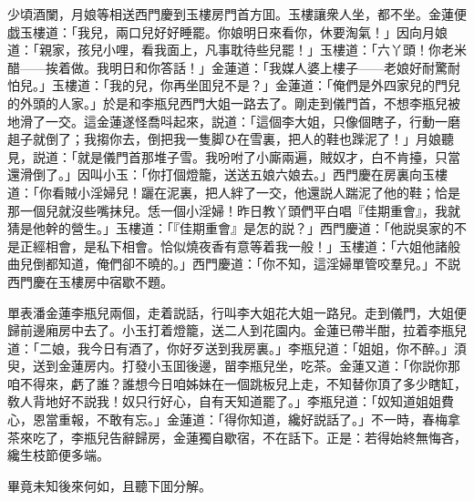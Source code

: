 少頃酒闌，月娘等相送西門慶到玉樓房門首方囬。玉樓讓衆人坐，都不坐。金蓮便戯玉樓道：「我兒，兩口兒好好睡罷。你娘明日來看你，休要淘氣！」因向月娘道：「親家，孩兒小哩，看我面上，凡事耽待些兒罷！」玉樓道：「六丫頭！你老米醋——挨着做。我明日和你答話！」金蓮道：「我媒人婆上樓子——老娘好耐驚耐怕兒。」玉樓道：「我的兒，你再坐囬兒不是？」金蓮道：「俺們是外四家兒的門兒的外頭的人家。」於是和李瓶兒西門大姐一路去了。剛走到儀門首，不想李瓶兒被地滑了一交。這金蓮遂怪喬呌起來，説道：「這個李大姐，只像個瞎子，行動一磨趄子就倒了；我搊你去，倒把我一隻脚ひ在雪裏，把人的鞋也䠕泥了！」月娘聽見，説道：「就是儀門首那堆子雪。我吩咐了小廝兩遍，賊奴才，白不肯擡，只當還滑倒了。」因叫小玉：「你打個燈籠，送送五娘六娘去。」西門慶在房裏向玉樓道：「你看賊小淫婦兒！躧在泥裏，把人絆了一交，他還説人踹泥了他的鞋；恰是那一個兒就沒些嘴抹兒。恁一個小淫婦！昨日教丫頭們平白唱『佳期重會』，我就猜是他幹的營生。」玉樓道：「『佳期重會』是怎的説？」西門慶道：「他説吳家的不是正經相會，是私下相會。恰似燒夜香有意等着我一般！」玉樓道：「六姐他諸般曲兒倒都知道，俺們卻不曉的。」西門慶道：「你不知，這淫婦單管咬羣兒。」不説西門慶在玉樓房中宿歇不題。

單表潘金蓮李瓶兒兩個，走着説話，行叫李大姐花大姐一路兒。走到儀門，大姐便歸前邊廂房中去了。小玉打着燈籠，送二人到花園内。金蓮已帶半酣，拉着李瓶兒道：「二娘，我今日有酒了，你好歹送到我房裏。」李瓶兒道：「姐姐，你不醉。」湏臾，送到金蓮房内。打發小玉囬後邊，㽞李瓶兒坐，吃茶。金蓮又道：「你説你那咱不得來，虧了誰？誰想今日咱姊妹在一個跳板兒上走，不知替你頂了多少瞎缸，敎人背地好不説我！奴只行好心，自有天知道罷了。」李瓶兒道：「奴知道姐姐費心，恩當重報，不敢有忘。」金蓮道：「得你知道，纔好説話了。」不一時，春梅拿茶來吃了，李瓶兒告辭歸房，金蓮獨自歇宿，不在話下。正是：若得始終無悔吝，纔生枝節便多端。

畢竟未知後來何如，且聽下囬分解。

